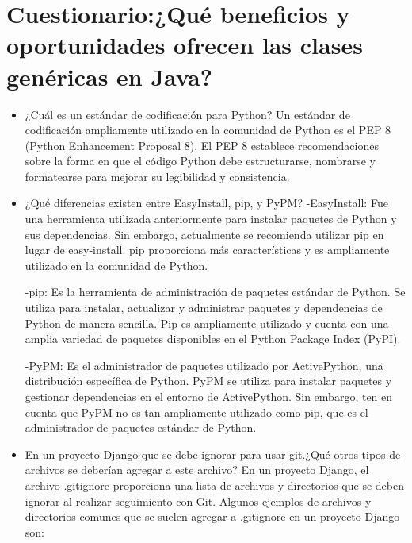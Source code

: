 \documentclass{article}
\begin{document}
    \section{Cuestionario:¿Qué beneficios y oportunidades ofrecen las clases genéricas en Java?}
    	\begin{itemize}
    		\item ¿Cuál es un estándar de codificación para Python? \newline
     Un estándar de codificación ampliamente utilizado en la comunidad de Python es el PEP 8 (Python Enhancement Proposal 8). El PEP 8 establece recomendaciones sobre la forma en que el código Python debe estructurarse, nombrarse y formatearse para mejorar su legibilidad y consistencia.       
    		\item ¿Qué diferencias existen entre EasyInstall, pip, y PyPM?\newline
      -EasyInstall: Fue una herramienta utilizada anteriormente para instalar paquetes de Python y sus dependencias. Sin embargo, actualmente se recomienda utilizar pip en lugar de easy-install. pip proporciona más características y es ampliamente utilizado en la comunidad de Python.

     -pip: Es la herramienta de administración de paquetes estándar de Python. Se utiliza para instalar, actualizar y administrar paquetes y dependencias de Python de manera sencilla. Pip es ampliamente utilizado y cuenta con una amplia variedad de paquetes disponibles en el Python Package Index (PyPI).

     -PyPM: Es el administrador de paquetes utilizado por ActivePython, una distribución específica de Python. PyPM se utiliza para instalar paquetes y gestionar dependencias en el entorno de ActivePython. Sin embargo, ten en cuenta que PyPM no es tan ampliamente utilizado como pip, que es el administrador de paquetes estándar de Python.
    		\item En un proyecto Django que se debe ignorar para usar git.¿Qué otros tipos de archivos se deberían agregar a este archivo?\newline
      En un proyecto Django, el archivo .gitignore proporciona una lista de archivos y directorios que se deben ignorar al realizar seguimiento con Git. Algunos ejemplos de archivos y directorios comunes que se suelen agregar a .gitignore en un proyecto Django son:
    

\end{itemize}
\end{document}
